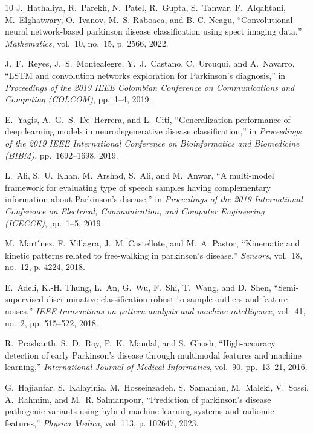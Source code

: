 \documentclass[twocolumn]{article}
\begin{document}
\begin{thebibliography}{10}
J.~Hathaliya, R.~Parekh, N.~Patel, R.~Gupta, S.~Tanwar, F.~Alqahtani,
  M.~Elghatwary, O.~Ivanov, M.~S. Raboaca, and B.-C. Neagu, ``Convolutional
  neural network-based parkinson disease classification using spect imaging
  data,'' \emph{Mathematics}, vol.~10, no.~15, p. 2566, 2022.

J.~F.~Reyes, J.~S.~Montealegre, Y.~J.~Castano, C.~Urcuqui, and A.~Navarro,
``LSTM and convolution networks exploration for Parkinson’s diagnosis,''
in \emph{Proceedings of the 2019 IEEE Colombian Conference on Communications and Computing (COLCOM)}, 
pp.~1--4, 2019.

E.~Yagis, A.~G.~S.~De~Herrera, and L.~Citi,
``Generalization performance of deep learning models in neurodegenerative disease classification,''
in \emph{Proceedings of the 2019 IEEE International Conference on Bioinformatics and Biomedicine (BIBM)}, 
pp.~1692--1698, 2019.

L.~Ali, S.~U.~Khan, M.~Arshad, S.~Ali, and M.~Anwar,
``A multi-model framework for evaluating type of speech samples having complementary information about Parkinson's disease,''
in \emph{Proceedings of the 2019 International Conference on Electrical, Communication, and Computer Engineering (ICECCE)}, 
pp.~1--5, 2019.

M.~Mart{\'\i}nez, F.~Villagra, J.~M. Castellote, and M.~A. Pastor, ``Kinematic
  and kinetic patterns related to free-walking in parkinson’s disease,''
  \emph{Sensors}, vol.~18, no.~12, p. 4224, 2018.

E.~Adeli, K.-H. Thung, L.~An, G.~Wu, F.~Shi, T.~Wang, and D.~Shen,
  ``Semi-supervised discriminative classification robust to sample-outliers and
  feature-noises,'' \emph{IEEE transactions on pattern analysis and machine
  intelligence}, vol.~41, no.~2, pp. 515--522, 2018.

R.~Prashanth, S.~D.~Roy, P.~K.~Mandal, and S.~Ghosh,
``High-accuracy detection of early Parkinson's disease through multimodal features and machine learning,''
\emph{International Journal of Medical Informatics}, vol.~90, pp.~13--21, 2016.

G.~Hajianfar, S.~Kalayinia, M.~Hosseinzadeh, S.~Samanian, M.~Maleki, V.~Sossi,
  A.~Rahmim, and M.~R. Salmanpour, ``Prediction of parkinson’s disease
  pathogenic variants using hybrid machine learning systems and radiomic
  features,'' \emph{Physica Medica}, vol. 113, p. 102647, 2023.


\end{thebibliography}
\end{document}
